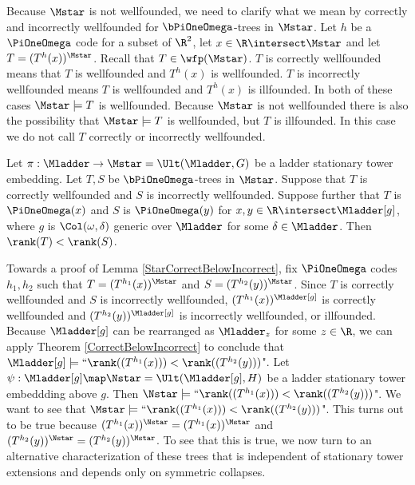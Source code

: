 \documentclass[oneside,12pt]{amsart}
\begin{document}
Because $\Mstar$ is not wellfounded, we need to clarify what we mean by correctly and incorrectly wellfounded
for $\bPiOneOmega$-trees in $\Mstar$.
Let $h$ be a $\PiOneOmega$ code for
a subset of $\R^2$, let $x\in\R\intersect\Mstar$ and let  $T=(T^h(x))^{\Mstar}$.
Recall that $T\in\wfp(\Mstar)$.
$T$ is correctly wellfounded means that $T$ is wellfounded and $T^h(x)$ is wellfounded.
$T$ is incorrectly wellfounded means $T$ is wellfounded and $T^h(x)$ is illfounded.
In both of these cases $\Mstar\models T$ is wellfounded. Because $\Mstar$ is not wellfounded there is also
the possibility that $\Mstar\models T$ is wellfounded, but $T$ is illfounded. In this case we do not
call $T$ correctly or incorrectly wellfounded.

\begin{lemma}
\label{StarCorrectBelowIncorrect}
Let $\pi:\Mladder\to\Mstar=\Ult(\Mladder,G)$ be a ladder stationary tower embedding.
Let $T,S$ be $\bPiOneOmega$-trees in $\Mstar$.
Suppose that $T$ is correctly wellfounded and
$S$ is incorrectly wellfounded. Suppose further that $T$ is $\PiOneOmega(x)$
and $S$ is $\PiOneOmega(y)$ for $x,y\in\R\intersect\Mladder[g]$,
where $g$ is $\Col(\omega,\delta)$ generic over $\Mladder$ for some $\delta\in\Mladder$.
Then $\rank(T) < \rank(S)$.
\end{lemma}

Towards a proof of Lemma \ref{StarCorrectBelowIncorrect},
fix $\PiOneOmega$ codes $h_1, h_2$
such that $T=(T^{h_1}(x))^{\Mstar}$ and
$S=(T^{h_2}(y))^{\Mstar}$. Since $T$ is correctly wellfounded
and $S$ is incorrectly wellfounded, $(T^{h_1}(x))^{\Mladder[g]}$
is correctly wellfounded and
$(T^{h_2}(y))^{\Mladder[g]}$
is incorrectly wellfounded, or illfounded.
Because $\Mladder[g]$ can be rearranged as $\Mladder_z$ for some $z\in\R$,
we can apply Theorem \ref{CorrectBelowIncorrect} to conclude that
$\Mladder[g]\models \text{``}\rank((T^{h_1}(x))) < \rank((T^{h_2}(y)))$".
Let $\psi:\Mladder[g]\map\Nstar=\Ult(\Mladder[g],H)$ be a ladder stationary tower embeddding
above $g$. Then $\Nstar\models \text{``}\rank((T^{h_1}(x))) < \rank((T^{h_2}(y)))$".
We want to see that $\Mstar\models \text{``}\rank((T^{h_1}(x))) < \rank((T^{h_2}(y)))$".
This turns out to be true because $(T^{h_1}(x))^{\Nstar}=(T^{h_1}(x))^{\Mstar}$
and $(T^{h_2}(y))^{\Nstar}=(T^{h_2}(y))^{\Mstar}$. To see that this is true, we
now turn to an alternative characterization of these trees that is independent
of stationary tower extensions and depends only on symmetric collapses.
\end{document}
